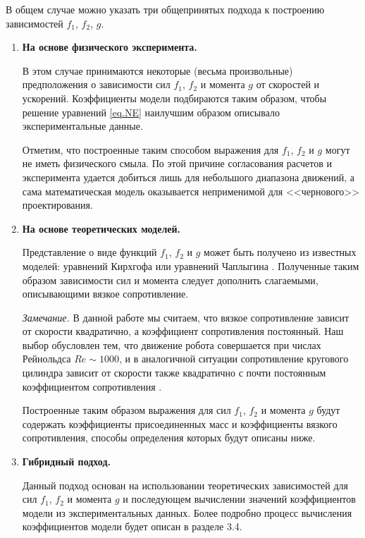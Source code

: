 В общем случае можно указать три общепринятых подхода к построению зависимостей $f_1$, $f_2$, $g$.	
\begin{enumerate}
	\itemsep=-2pt
	
	\item \textbf{На основе физического эксперимента.} 
	
	В этом случае принимаются некоторые (весьма произвольные) предположения о зависимости сил $f_1$, $f_2$ и момента $g$ от скоростей и ускорений. Коэффициенты модели подбираются таким образом, чтобы решение уравнений \eqref{eq.NE} наилучшим образом описывало экспериментальные данные. 
	
	Отметим, что построенные таким способом выражения для $f_1$, $f_2$ и $g$ могут не иметь физического смыла. По этой причине согласования расчетов и эксперимента удается добиться лишь для небольшого диапазона движений, а сама математическая модель оказывается неприменимой для <<чернового>> проектирования.
	
	\item \textbf{На основе теоретических моделей.}
	
	Представление о виде функций $f_1$, $f_2$ и $g$ может быть получено из известных моделей: уравнений Кирхгофа \cite{Kirchhoff_1869} или уравнений Чаплыгина \cite{Chaplygin}. Полученные таким образом зависимости сил и момента следует дополнить слагаемыми, описывающими вязкое сопротивление. 
	
	\vspace{-2mm}
	
	\textit{Замечание.}
		В данной работе мы считаем, что вязкое сопротивление зависит от скорости квадратично, а коэффициент сопротивления постоянный. Наш выбор обусловлен тем, что движение робота совершается при числах Рейнольдса $Re \sim 1000$, и в аналогичной ситуации сопротивление кругового цилиндра зависит от скорости также квадратично с почти постоянным коэффициентом сопротивления \cite{Schlichting}.

	
	\vspace{-2mm}
	
	Построенные таким образом выражения для сил $f_1$, $f_2$ и момента $g$ будут содержать коэффициенты присоединенных масс и коэффициенты вязкого сопротивления, способы определения которых будут описаны ниже.
	
	\item \textbf{Гибридный подход.}
	
	Данный подход основан на использовании теоретических зависимостей для сил $f_1$, $f_2$ и момента $g$ и последующем вычислении значений коэффициентов модели  из экспериментальных данных. Более подробно процесс вычисления коэффициентов модели будет описан в разделе 3.4.
	
\end{enumerate}

